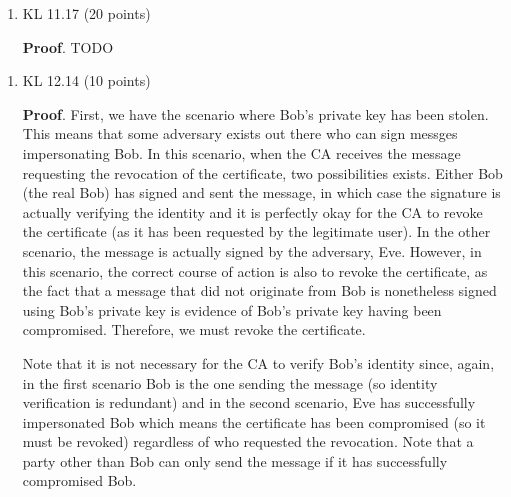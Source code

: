 \documentclass{article}
\begin{document}
\begin{enumerate}[noitemsep,topsep=\mdcompacttopsep,label=\alph*.]
\begin{enumerate}[noitemsep,topsep=\mdcompacttopsep,start=3]%

\item{}KL 11.17  (20 points)

\begin{mdbmarginx}{1ex}{0pt}{1ex}{0pt}%
\noindent{}\textbf{Proof}.  TODO%
\end{mdbmarginx}%
\end{enumerate}%
\end{enumerate}%

\begin{enumerate}[,start=4]%

\item{}
KL 12.14 (10 points)%

\begin{mdbmarginx}{1ex}{0pt}{1ex}{0pt}%
\noindent{}\textbf{Proof}.  
First, we have the scenario where Bob's private key has been stolen. This means that some adversary exists
out there who can sign messges impersonating Bob. In this scenario, when the CA receives the message
requesting the revocation of the certificate, two possibilities exists. Either Bob (the real Bob) has
signed and sent the message, in which case the signature is actually verifying the identity and it is
perfectly okay for the CA to revoke the certificate (as it has been requested by the legitimate user). In the
other scenario, the message is actually signed by the adversary, Eve. However, in this scenario,
the correct course of action is also to revoke the certificate, as the fact that a message that did 
not originate from Bob is nonetheless signed using Bob's private key is evidence of Bob's private
key having been compromised. Therefore, we must revoke the certificate.%

Note that it is not necessary for the CA to verify Bob's identity since, again, in the first scenario
Bob is the one sending the message (so identity verification is redundant) and in the second scenario,
Eve has successfully impersonated Bob which means the certificate has been compromised (so it must be
revoked) regardless of who requested the revocation. Note that a party other than Bob can only
send the message if it has successfully compromised Bob.%
\end{mdbmarginx}%


\end{enumerate}
\end{document}
